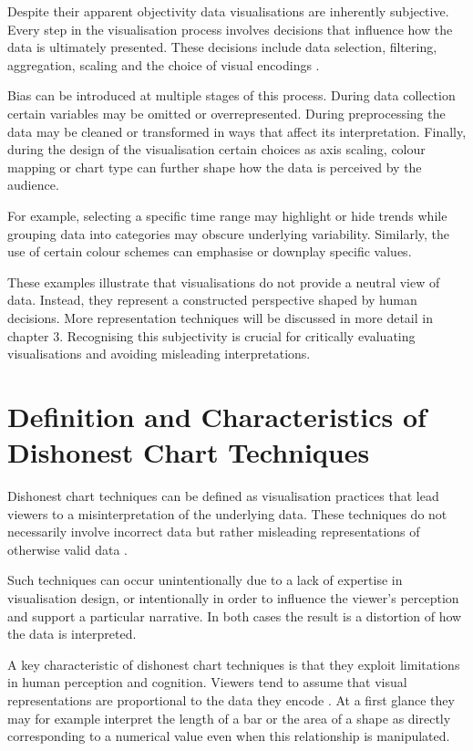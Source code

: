 Despite their apparent objectivity data visualisations are inherently subjective. Every step in the visualisation process involves decisions that influence how the data is ultimately presented. These decisions include data selection, filtering, aggregation, scaling and the choice of visual encodings \cite{cairo2019}.

Bias can be introduced at multiple stages of this process. During data collection certain variables may be omitted or overrepresented. During preprocessing the data may be cleaned or transformed in ways that affect its interpretation. Finally, during the design of the  visualisation certain choices as axis scaling, colour mapping or chart type can further shape how the data is perceived by the audience.

For example, selecting a specific time range may highlight or hide trends while grouping data into categories may obscure underlying variability. Similarly, the use of certain colour schemes can emphasise or downplay specific values.

These examples illustrate that visualisations do not provide a neutral view of data. Instead, they represent a constructed perspective shaped by human decisions. More representation techniques will be discussed in more detail in chapter 3.  Recognising this subjectivity is crucial for critically evaluating visualisations and avoiding misleading interpretations.

\section{Definition and Characteristics of Dishonest Chart Techniques}

Dishonest chart techniques can be defined as visualisation practices that lead viewers to a misinterpretation of the underlying data. These techniques do not necessarily involve incorrect data but rather misleading representations of otherwise valid data \cite{cairo2019,tufte2001}.

Such techniques can occur unintentionally due to a lack of expertise in visualisation design, or intentionally in order to influence the viewer’s perception and support a particular narrative. In both cases the result is a distortion of how the data is interpreted.

A key characteristic of dishonest chart techniques is that they exploit limitations in human perception and cognition. Viewers tend to assume that visual representations are proportional to the data they encode \cite{cleveland1984}. At a first glance they may for example interpret the length of a bar or the area of a shape as directly corresponding to a numerical value even when this relationship is manipulated. 

